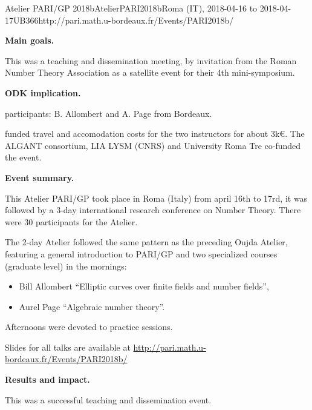 \begin{event}{Atelier PARI/GP 2018b}{AtelierPARI2018b}{Roma (IT),
2018-04-16 to 2018-04-17}{UB}{36}{6}{http://pari.math.u-bordeaux.fr/Events/PARI2018b/}

\textbf{Main goals.}

This was a teaching and dissemination meeting, by invitation from the Roman
  Number Theory Association as a satellite event for their 4th
  mini-symposium.

\textbf{ODK implication.} 

\ODK participants: B. Allombert and A. Page from Bordeaux.

\ODK funded travel and accomodation costs for the two instructors for about
  3k\euro. The ALGANT consortium, LIA LYSM (CNRS) and University Roma Tre
  co-funded the event.

\textbf{Event summary.} 

This Atelier PARI/GP took place in Roma (Italy) from april 16th to
17rd, it was followed by a 3-day international research conference on
  Number Theory. There were 30 participants for the Atelier.

The 2-day Atelier followed the same pattern as the preceding Oujda Atelier,
featuring a general introduction to PARI/GP and two 
  specialized courses (graduate level) in the mornings:
\begin{itemize}
\item Bill Allombert ``Elliptic curves over finite fields and number fields'',
\item Aurel Page ``Algebraic number theory''.
\end{itemize}
Afternoons were devoted to practice sessions.

Slides for all talks are available at
\url{http://pari.math.u-bordeaux.fr/Events/PARI2018b/}

\textbf{Results and impact.} 

This was a successful teaching and dissemination event.
\end{event}
